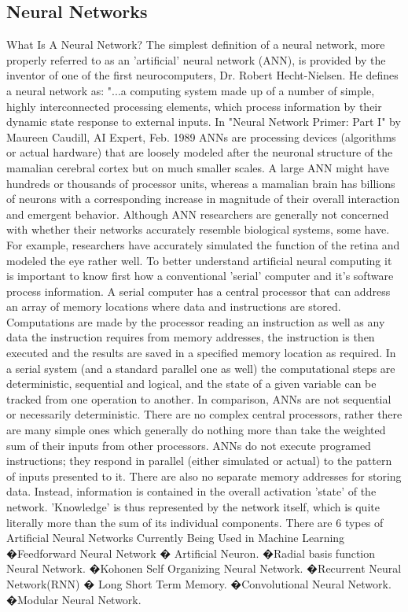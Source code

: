   \subsection{Neural Networks}
What Is A Neural Network?
The simplest definition of a neural network, more properly referred to as an 'artificial' neural network (ANN), is provided by the inventor of one of the first neurocomputers, Dr. Robert Hecht-Nielsen. He defines a neural network as:
"...a computing system made up of a number of simple, highly interconnected processing elements, which process information by their dynamic state response to external inputs.
In "Neural Network Primer: Part I" by Maureen Caudill, AI Expert, Feb. 1989
ANNs are processing devices (algorithms or actual hardware) that are loosely modeled after the neuronal structure of the mamalian cerebral cortex but on much smaller scales. A large ANN might have hundreds or thousands of processor units, whereas a mamalian brain has billions of neurons with a corresponding increase in magnitude of their overall interaction and emergent behavior. Although ANN researchers are generally not concerned with whether their networks accurately resemble biological systems, some have. For example, researchers have accurately simulated the function of the retina and modeled the eye rather well.
To better understand artificial neural computing it is important to know first how a conventional 'serial' computer and it's software process information. A serial computer has a central processor that can address an array of memory locations where data and instructions are stored. Computations are made by the processor reading an instruction as well as any data the instruction requires from memory addresses, the instruction is then executed and the results are saved in a specified memory location as required. In a serial system (and a standard parallel one as well) the computational steps are deterministic, sequential and logical, and the state of a given variable can be tracked from one operation to another.
In comparison, ANNs are not sequential or necessarily deterministic. There are no complex central processors, rather there are many simple ones which generally do nothing more than take the weighted sum of their inputs from other processors. ANNs do not execute programed instructions; they respond in parallel (either simulated or actual) to the pattern of inputs presented to it. There are also no separate memory addresses for storing data. Instead, information is contained in the overall activation 'state' of the network. 'Knowledge' is thus represented by the network itself, which is quite literally more than the sum of its individual components.
There are 6 types of Artificial Neural Networks Currently Being Used in Machine Learning
�Feedforward Neural Network � Artificial Neuron.
�Radial basis function Neural Network.
�Kohonen Self Organizing Neural Network.
�Recurrent Neural Network(RNN) � Long Short Term Memory.
�Convolutional Neural Network.
�Modular Neural Network.
